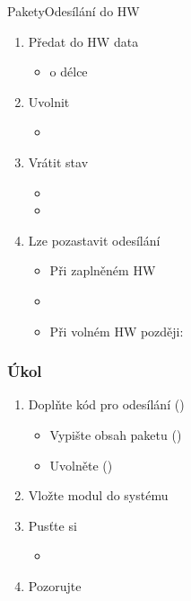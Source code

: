 \begin{frame}{Pakety}{Odesílání do HW}

  \begin{enumerate}
    \item Předat do HW data
    \begin{itemize}
      \item {} o délce 
    \end{itemize}

    \item Uvolnit 
    \begin{itemize}
      \item {}
    \end{itemize}

    \item Vrátit stav
    \begin{itemize}
      \item {}
      \item {}
    \end{itemize}

    \item Lze pozastavit odesílání
    \begin{itemize}
      \item Při zaplněném HW
      \item {}
      \item Při volném HW později: 
    \end{itemize}
  \end{enumerate}

\end{frame}

\begin{frame}
  \frametitle{Úkol}

  \begin{enumerate}
    \item Doplňte kód pro odesílání ()
    \begin{itemize}
      \item Vypište obsah paketu ()
      \item Uvolněte  ()
    \end{itemize}

    \item Vložte modul do systému
    \item Pusťte si 
    \begin{itemize}
      \item {}
    \end{itemize}

    \item Pozorujte 
  \end{enumerate}

\end{frame}

